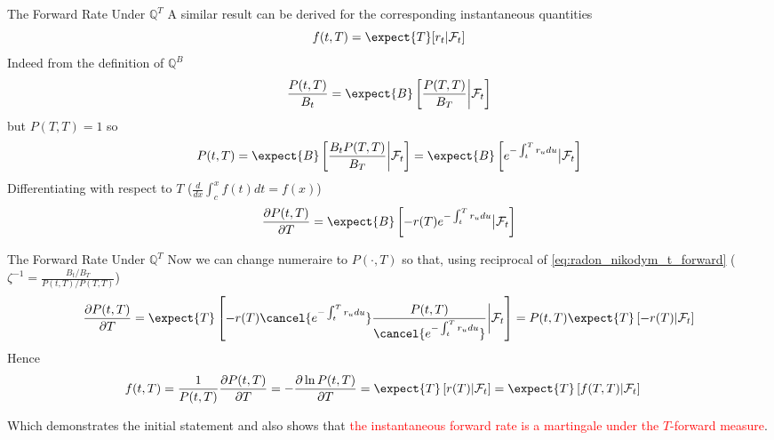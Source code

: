 \documentclass{beamer}
\begin{document}
\begin{frame}{The Forward Rate Under $\mathbb{Q}^T$}
  A similar result can be derived for the corresponding instantaneous quantities
  \begin{equation}
    f(t,T)=\expect{T}[r_t|\mathcal{F}_t]
  \end{equation}
	\pause
  Indeed from the definition of $\mathbb{Q}^B$
  \begin{equation*}
    \frac{P(t,T)}{B_t}=\expect{B}\left[\frac{P(T,T)}{B_T}\bigg|\mathcal{F}_t\right]
  \end{equation*}
  but $P(T,T)=1$ so
  \begin{equation*}
    P(t,T)=\expect{B}\left[\frac{B_tP(T,T)}{B_T}\bigg|\mathcal{F}_t\right]=\expect{B}\left[e^{-\int_t^Tr_u du}\big|\mathcal{F}_t\right]
  \end{equation*}
	\pause
  Differentiating with respect to $T$ ($\frac{d}{dx}\int_c^x f(t)dt=f(x)$)
  \begin{equation*}
    \frac{\partial P(t,T)}{\partial T}=
    \expect{B}\left[-r(T)e^{-\int_t^Tr_u du}\big|\mathcal{F}_t\right]
  \end{equation*}
\end{frame}

\begin{frame}{The Forward Rate Under $\mathbb{Q}^T$}
  Now we can change numeraire to $P(\cdot,T)$ so that, using reciprocal of \cref{eq:radon_nikodym_t_forward} ($\zeta^{-1}=\frac{B_t/B_T}{P(t,T)/P(T,T)}$)
  \begin{equation*}
    \frac{\partial P(t,T)}{\partial T}=
    \expect{T}\left[-r(T)\cancel{e^{-\int_t^Tr_u du}}\frac{P(t,T)}{\cancel{e^{-\int_t^Tr_u du}}}\bigg|\mathcal{F}_t\right]=
    P(t,T)\expect{T}\left[-r(T)|\mathcal{F}_t\right]
  \end{equation*}
	\pause
  Hence
  \begin{equation*}
    \begin{aligned}
      f(t,T)&=\frac{1}{P(t,T)}\frac{\partial P(t,T)}{\partial T}=
      -\frac{\partial \ln P(t,T)}{\partial T}
      = \expect{T}\left[r(T)|\mathcal{F}_t\right]=	\expect{T}\left[f(T,T)|\mathcal{F}_t\right]
    \end{aligned}
  \end{equation*}\myendproof

  Which demonstrates the initial statement and also shows that \textcolor{red}{the instantaneous forward rate is a martingale under the $T$-forward measure}.
\end{frame}
\end{document}
